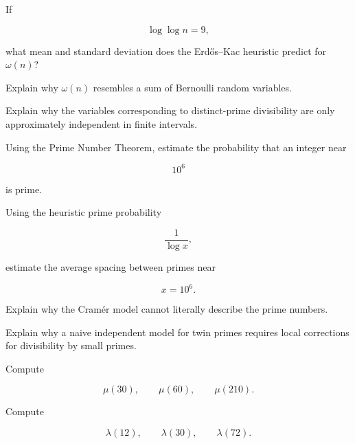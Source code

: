 \begin{exercise}[2]
If

\[ \log\log n=9, \]

what mean and standard deviation does the Erdős--Kac heuristic predict for
\(\omega(n)\)?
\end{exercise}

\begin{exercise}[3]
Explain why \(\omega(n)\) resembles a sum of Bernoulli random variables.
\end{exercise}

\begin{exercise}[3]
Explain why the variables corresponding to distinct-prime divisibility are
only approximately independent in finite intervals.
\end{exercise}

\begin{exercise}[2]
Using the Prime Number Theorem, estimate the probability that an integer near

\[ 10^6 \]

is prime.
\end{exercise}

\begin{exercise}[2]
Using the heuristic prime probability

\[ \frac1{\log x}, \]

estimate the average spacing between primes near

\[ x=10^6. \]
\end{exercise}

\begin{exercise}[2]
Explain why the Cramér model cannot literally describe the prime numbers.
\end{exercise}

\begin{exercise}[3]
Explain why a naive independent model for twin primes requires local
corrections for divisibility by small primes.
\end{exercise}

\begin{exercise}[2]
Compute

\[ \mu(30),\qquad\mu(60),\qquad\mu(210). \]
\end{exercise}

\begin{exercise}[2]
Compute

\[ \lambda(12),\qquad\lambda(30),\qquad\lambda(72). \]
\end{exercise}

